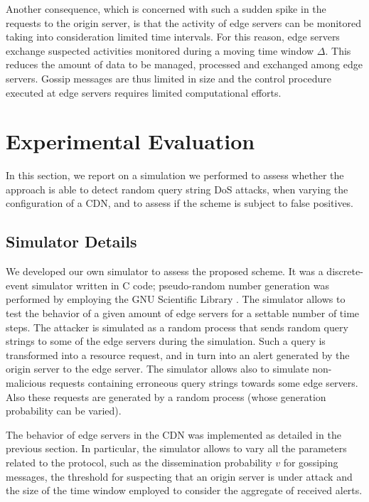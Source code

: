 \documentclass{IEEEtran}
\begin{document}
Another consequence, which is concerned with such a sudden spike in the requests to the origin server, is that the activity of edge servers can be monitored taking into consideration limited time intervals. For this reason, edge servers exchange suspected activities monitored during a moving time window $\Delta$. This reduces the amount of data to be managed, processed and exchanged among edge servers. Gossip messages are thus limited in size and the control procedure executed at edge servers requires limited computational efforts.


\section{Experimental Evaluation}
\label{sec:exp}

In this section, we report on a simulation we performed to assess whether the approach is able to detect random query string DoS attacks, when varying the configuration of a CDN, and to assess if the scheme is subject to false positives.

\subsection{Simulator Details}

We developed our own simulator to assess the proposed scheme. It was a discrete-event simulator written in C code; pseudo-random number generation was performed by employing the GNU Scientific Library \cite{gsl-web-2010}. The simulator allows to test the behavior of a given amount of edge servers for a settable number of time steps.
The attacker is simulated as a random process that sends random query strings to some of the edge servers during the simulation. Such a query is transformed into a resource request, and in turn into an alert generated by the origin server to the edge server. The simulator allows also to simulate non-malicious requests containing erroneous query strings towards some edge servers. Also these requests are generated by a random process (whose generation probability can be varied).

The behavior of edge servers in the CDN was implemented as detailed in the previous section. In particular, the simulator allows to vary all the parameters related to the protocol, such as the dissemination probability $v$ for gossiping messages, the threshold for suspecting that an origin server is under attack and the size of the time window employed to consider the aggregate of received alerts.
\end{document}
